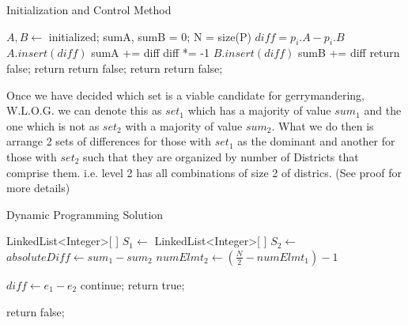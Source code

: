 \documentclass[12pt]{article}
\begin{document}
\begin{algorithm}[H]
\caption{Initialization and Control Method}
\begin{algorithmic}
        \State $A, B \gets$ initialized; sumA, sumB = 0; N = size(P)
            \State $diff = p_i.A - p_i.B$
                \State $A.insert(diff)$
                \State sumA += diff
            \Else
                \State diff *= -1
                \State $B.insert(diff)$
                \State sumB += diff
            \EndIf
        \EndFor
                return false;
            \EndIf
            \State return 
                return false;
            \EndIf
            \State return 
            \State return false;
        \EndIf
    \EndProcedure
\end{algorithmic}
\end{algorithm}

Once we have decided which set is a viable candidate for gerrymandering, W.L.O.G. we can denote this as
$set_1$ which has a majority of value $sum_1$ and the one which is not as $set_2$ with a majority of value
$sum_2$. What we do then is arrange 2 sets of differences for those with $set_1$ as the dominant and another
for those with $set_2$ such that they are organized by number of Districts that comprise them. i.e. level 2
has all combinations of size 2 of districs.  (See proof for more details)

\begin{algorithm}[H]
\caption{Dynamic Programming Solution}
\begin{algorithmic}
        \State LinkedList\textless Integer\textgreater[ ] $S_1 \gets$ 
        \State LinkedList\textless Integer\textgreater[ ] $S_2 \gets$ 
        \State $absoluteDiff \gets sum_1 - sum_2$
            \State $numElmt_2 \gets (\frac{N}{2} - numElmt_1) - 1$

            \Else
                        \State $diff \gets e_1 - e_2$
                            \State continue;
                        \EndIf
                        \State return true;
                    \EndFor

                \EndFor
            \EndIf
        \EndFor
        \State return false;
    \EndProcedure
\end{algorithmic}
\end{algorithm}
\end{document}
